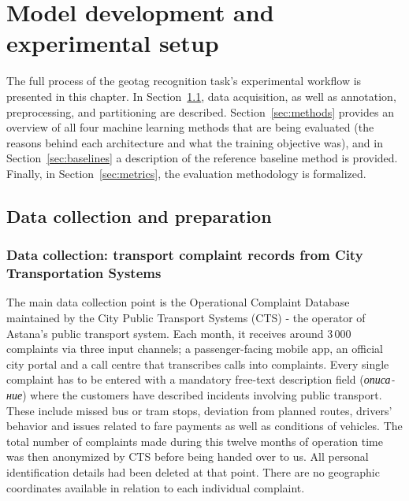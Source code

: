 %
%

\chapter{Model development and experimental setup}
\label{chap:setup}

The full process of the geotag recognition task's experimental workflow is presented in this chapter. In Section~\ref{sec:data}, data acquisition, as well as annotation, preprocessing, and partitioning are described. Section~\ref{sec:methods} provides an overview of all four machine learning methods that are being evaluated (the reasons behind each architecture and what the training objective was), and in Section~\ref{sec:baselines} a description of the reference baseline method is provided. Finally, in Section~\ref{sec:metrics}, the evaluation methodology is formalized.

\section{Data collection and preparation}
\label{sec:data}

\subsection{Data collection: transport complaint records from City Transportation Systems}
\label{sec:data_collection}

The main data collection point is the Operational Complaint Database maintained by the City Public Transport Systems (CTS) - the operator of Astana's public transport system. Each month, it receives around 3\,000 complaints via three input channels; a passenger-facing mobile app, an official city portal and a call centre that transcribes calls into complaints. Every single complaint has to be entered with a mandatory free-text description field (\foreignlanguage{russian}{\textit{описание}}) where the customers have described incidents involving public transport. These include missed bus or tram stops, deviation from planned routes, drivers' behavior and issues related to fare payments as well as conditions of vehicles. The total number of complaints made during this twelve months of operation time was then anonymized by CTS before being handed over to us. All personal identification details had been deleted at that point. There are no geographic coordinates available in relation to each individual complaint.


